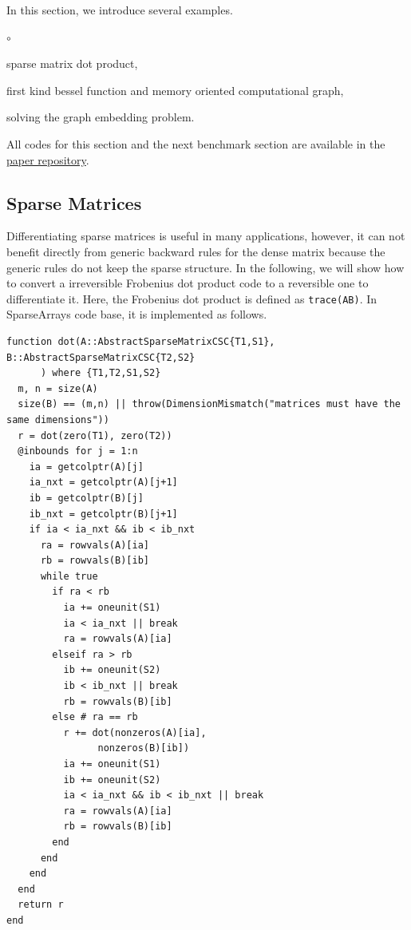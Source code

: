 \documentclass{article}
\newcommand{\<}{\langle}
\renewcommand{\>}{\rangle}
\theoremstyle{definition}\newtheorem{definition}{\textit{Definition}}
\begin{document}
In this section, we introduce several examples.
\begin{list}{$\circ$}{}
\item sparse matrix dot product,
\item first kind bessel function and memory oriented computational graph,
\item solving the graph embedding problem.
\end{list}

All codes for this section and the next benchmark section are available in the \href{https://github.com/GiggleLiu/nilangpaper}{paper repository}.

\subsection{Sparse Matrices}
Differentiating sparse matrices is useful in many applications, however, it can not benefit directly from generic backward rules for the dense matrix because the generic rules do not keep the sparse structure.
In the following, we will show how to convert a irreversible Frobenius dot product code to a reversible one to differentiate it.
Here, the Frobenius dot product is defined as \texttt{trace(A\textquotesingle B)}.
In SparseArrays code base, it is implemented as follows.

\begin{minipage}{\columnwidth}
\begin{lstlisting}[multicols=2]
function dot(A::AbstractSparseMatrixCSC{T1,S1}, B::AbstractSparseMatrixCSC{T2,S2}
      ) where {T1,T2,S1,S2}
  m, n = size(A)
  size(B) == (m,n) || throw(DimensionMismatch("matrices must have the same dimensions"))
  r = dot(zero(T1), zero(T2))
  @inbounds for j = 1:n
    ia = getcolptr(A)[j]
    ia_nxt = getcolptr(A)[j+1]
    ib = getcolptr(B)[j]
    ib_nxt = getcolptr(B)[j+1]
    if ia < ia_nxt && ib < ib_nxt
      ra = rowvals(A)[ia]
      rb = rowvals(B)[ib]
      while true
        if ra < rb
          ia += oneunit(S1)
          ia < ia_nxt || break
          ra = rowvals(A)[ia]
        elseif ra > rb
          ib += oneunit(S2)
          ib < ib_nxt || break
          rb = rowvals(B)[ib]
        else # ra == rb
          r += dot(nonzeros(A)[ia],
                nonzeros(B)[ib])
          ia += oneunit(S1)
          ib += oneunit(S2)
          ia < ia_nxt && ib < ib_nxt || break
          ra = rowvals(A)[ia]
          rb = rowvals(B)[ib]
        end
      end
    end
  end
  return r
end
\end{lstlisting}
\end{minipage}
\end{document}
